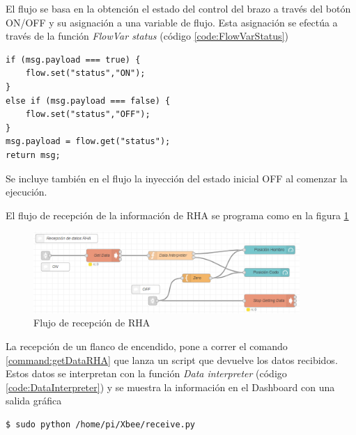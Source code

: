 El flujo se basa en la obtención el estado del control del brazo a través del botón ON/OFF y su asignación a una variable de flujo. Esta asignación se efectúa a través de la función \textit{FlowVar status} (código \ref{code:FlowVarStatus})



\begin{lstlisting}[frame=leftline, caption={FlowVar status}, label=code:FlowVarStatus]
if (msg.payload === true) {
    flow.set("status","ON");
}
else if (msg.payload === false) {
    flow.set("status","OFF");
}
msg.payload = flow.get("status");
return msg;
\end{lstlisting}

Se incluye también en el flujo la inyección del estado inicial OFF al comenzar la ejecución.

El flujo de recepción de la información de RHA se programa como en la figura \ref{fig:RecepcionRHA}

\begin{figure}[H]
\centering
\includegraphics[width=0.9\textwidth]{figuras/RecepcionFlowRHA.png}
\caption{Flujo de recepción de RHA}
\label{fig:RecepcionRHA}
\end{figure}

La recepción de un flanco de encendido, pone a correr el comando \ref{command:getDataRHA} que lanza un script que devuelve los datos recibidos. Estos datos se interpretan con la función \textit{Data interpreter} (código \ref{code:DataInterpreter}) y se muestra la información en el Dashboard con una salida gráfica


\begin{lstlisting}[frame=single, label=command:getDataRHA]
$ sudo python /home/pi/Xbee/receive.py
\end{lstlisting}

